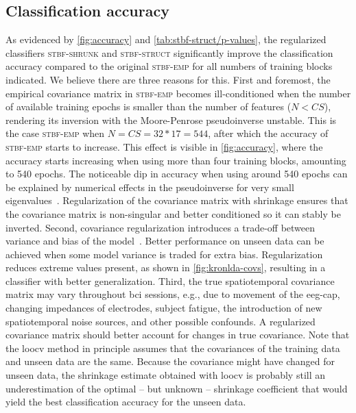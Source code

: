 	\subsection{Classification accuracy}
	As evidenced by \cref{fig:accuracy} and \cref{tab:stbf-struct/p-values},
  the regularized classifiers \textsc{stbf-shrunk}
	and \textsc{stbf-struct} significantly improve the classification accuracy
	compared to the original \textsc{stbf-emp} for all numbers of training blocks
  indicated.
	We believe there are three reasons for this.
	First and foremost, the empirical covariance matrix in \textsc{stbf-emp} becomes
	ill-conditioned when the number of available training epochs is smaller than
	the number of features ($N<CS$), rendering its inversion with the
	Moore-Penrose pseudoinverse unstable.
	This is the case \textsc{stbf-emp} when $N=CS=32*17=544$, after which the
	accuracy of \textsc{stbf-emp} starts to increase.
	This effect is visible in \cref{fig:accuracy}, where the accuracy starts
	increasing when using more than four training blocks, amounting to 540 epochs.
	The noticeable dip in accuracy when using around 540 epochs can be explained by
	numerical effects in the pseudoinverse for very small
	eigenvalues~\cite{Blankertz2011, Raudys1998, Schaefer2004,
		Kraemer2009}.
	Regularization of the covariance matrix with shrinkage ensures that the
	covariance matrix is non-singular and better conditioned so it can stably be inverted.
	Second, covariance regularization introduces a trade-off between variance and bias of the model~\cite{Ledoit2004}.
	Better performance on unseen data can be achieved when some model variance is
	traded for extra bias.
	Regularization reduces extreme values present, as shown in
	\cref{fig:kronlda-covs}, resulting in a classifier with
	better generalization.
	Third, the true spatiotemporal covariance matrix may vary throughout \ac{bci}
	sessions, e.g., due to movement of the \ac{eeg}-cap, changing impedances of
	electrodes, subject fatigue, the introduction of new spatiotemporal noise
	sources, and other possible confounds.
	A regularized covariance matrix should better account for changes in true covariance.
	Note that the \ac{loocv} method in principle assumes that the covariances of
	the training data and unseen data are the same.
	Because the covariance might have changed for unseen data, the shrinkage
	estimate obtained with \ac{loocv} is probably still an
	underestimation of the optimal -- but unknown -- shrinkage coefficient that
	would yield the best classification accuracy for the unseen data.

